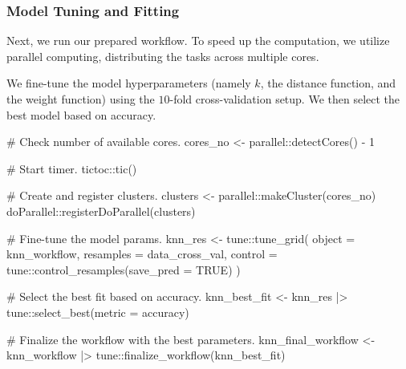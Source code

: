 \documentclass[
  letterpaper,
  DIV=11,
  numbers=noendperiod]{scrartcl}
\newenvironment{Shaded}{\begin{snugshade}}{\end{snugshade}}
\newcommand{\AttributeTok}[1]{\textcolor[rgb]{0.40,0.45,0.13}{#1}}
\newcommand{\CommentTok}[1]{\textcolor[rgb]{0.37,0.37,0.37}{#1}}
\newcommand{\ConstantTok}[1]{\textcolor[rgb]{0.56,0.35,0.01}{#1}}
\newcommand{\DecValTok}[1]{\textcolor[rgb]{0.68,0.00,0.00}{#1}}
\newcommand{\FunctionTok}[1]{\textcolor[rgb]{0.28,0.35,0.67}{#1}}
\newcommand{\NormalTok}[1]{\textcolor[rgb]{0.00,0.23,0.31}{#1}}
\newcommand{\OtherTok}[1]{\textcolor[rgb]{0.00,0.23,0.31}{#1}}
\newcommand{\SpecialCharTok}[1]{\textcolor[rgb]{0.37,0.37,0.37}{#1}}
\newcommand{\StringTok}[1]{\textcolor[rgb]{0.13,0.47,0.30}{#1}}
\begin{document}
\subsubsection{Model Tuning and Fitting}\label{model-tuning-and-fitting}

Next, we run our prepared workflow. To speed up the computation, we
utilize parallel computing, distributing the tasks across multiple
cores.

We fine-tune the model hyperparameters (namely \(k\), the distance
function, and the weight function) using the \(10\)-fold
cross-validation setup. We then select the best model based on accuracy.

\begin{Shaded}
\begin{Highlighting}[]
\CommentTok{\#\textquotesingle{} Check number of available cores.}
\NormalTok{cores\_no }\OtherTok{\textless{}{-}}\NormalTok{ parallel}\SpecialCharTok{::}\FunctionTok{detectCores}\NormalTok{() }\SpecialCharTok{{-}} \DecValTok{1}

\CommentTok{\#\textquotesingle{} Start timer.}
\NormalTok{tictoc}\SpecialCharTok{::}\FunctionTok{tic}\NormalTok{()}

\CommentTok{\# Create and register clusters.}
\NormalTok{clusters }\OtherTok{\textless{}{-}}\NormalTok{ parallel}\SpecialCharTok{::}\FunctionTok{makeCluster}\NormalTok{(cores\_no)}
\NormalTok{doParallel}\SpecialCharTok{::}\FunctionTok{registerDoParallel}\NormalTok{(clusters)}

\CommentTok{\# Fine{-}tune the model params.}
\NormalTok{knn\_res }\OtherTok{\textless{}{-}}\NormalTok{ tune}\SpecialCharTok{::}\FunctionTok{tune\_grid}\NormalTok{(}
  \AttributeTok{object =}\NormalTok{ knn\_workflow,}
  \AttributeTok{resamples =}\NormalTok{ data\_cross\_val,}
  \AttributeTok{control =}\NormalTok{ tune}\SpecialCharTok{::}\FunctionTok{control\_resamples}\NormalTok{(}\AttributeTok{save\_pred =} \ConstantTok{TRUE}\NormalTok{)}
\NormalTok{)}

\CommentTok{\# Select the best fit based on accuracy.}
\NormalTok{knn\_best\_fit }\OtherTok{\textless{}{-}} 
\NormalTok{  knn\_res }\SpecialCharTok{|\textgreater{}} 
\NormalTok{  tune}\SpecialCharTok{::}\FunctionTok{select\_best}\NormalTok{(}\AttributeTok{metric =} \StringTok{\textquotesingle{}accuracy\textquotesingle{}}\NormalTok{)}

\CommentTok{\# Finalize the workflow with the best parameters.}
\NormalTok{knn\_final\_workflow }\OtherTok{\textless{}{-}} 
\NormalTok{  knn\_workflow }\SpecialCharTok{|\textgreater{}}
\NormalTok{  tune}\SpecialCharTok{::}\FunctionTok{finalize\_workflow}\NormalTok{(knn\_best\_fit)}


\end{Highlighting}
\end{Shaded}
\end{document}
